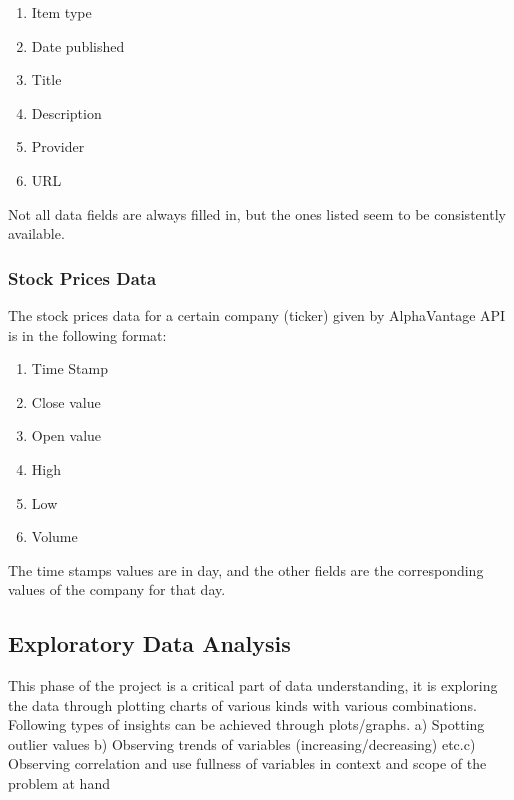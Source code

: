 \documentclass[sigconf, nonacm]{acmart}
\begin{document}
\begin{enumerate}
    \item Item type
    \item Date published
    \item Title
    \item Description
    \item Provider
    \item URL
\end{enumerate}

Not all data fields are always filled in, but the ones listed seem to be consistently available.

\subsubsection{Stock Prices Data}
The stock prices data for a certain company (ticker) given by AlphaVantage API is in the following format:

\begin{enumerate}
    \item Time Stamp
    \item Close value
    \item Open value
    \item High
    \item Low
    \item Volume
\end{enumerate}

The time stamps values are in day, and the other fields are the corresponding values of the company for that day.

\subsection{Exploratory Data Analysis} %
This phase of the project is a critical part of data understanding, it is exploring the data through plotting charts of various kinds with various combinations. Following types of insights can be achieved through plots/graphs. a) Spotting outlier values b)
Observing trends of variables (increasing/decreasing) etc.c) Observing correlation and use fullness of variables  in context and scope of the problem at hand
\end{document}

